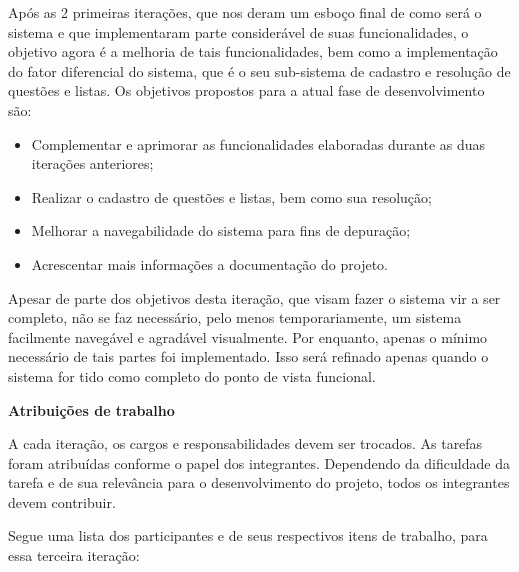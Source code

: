 \documentclass[12pt,letterpaper]{article}
\begin{document}
Após as 2 primeiras iterações, que nos deram um esboço final de como será o sistema 
e que implementaram parte considerável de suas funcionalidades, o objetivo agora é a 
melhoria de tais funcionalidades, bem como a implementação do fator diferencial do 
sistema, que é o seu sub-sistema de cadastro e resolução de questões e listas.
Os objetivos propostos para a atual fase de desenvolvimento são:

\begin{itemize}
\item{} Complementar e aprimorar as funcionalidades elaboradas durante as duas iterações anteriores;
\item{} Realizar o cadastro de questões e listas, bem como sua resolução;
\item{} Melhorar a navegabilidade do sistema para fins de depuração;
\item{} Acrescentar mais informações a documentação do projeto.
\end{itemize}

Apesar de parte dos objetivos desta iteração, que visam fazer o sistema vir a ser 
completo, não se faz necessário, pelo menos temporariamente, um sistema facilmente 
navegável e agradável visualmente. Por enquanto, apenas o mínimo necessário de tais 
partes foi implementado. Isso será refinado apenas quando o sistema for tido como completo 
do ponto de vista funcional.

\vspace{1cm}
{\large {\bf Atribuições de trabalho}}
\vspace{0.5cm}

A cada iteração, os cargos e responsabilidades devem ser trocados. As tarefas foram atribuídas conforme o papel dos integrantes. Dependendo da dificuldade da tarefa e de sua relevância para o desenvolvimento do projeto, todos os integrantes devem contribuir.

Segue uma lista dos participantes e de seus respectivos itens de trabalho, para essa terceira iteração: 
\end{document}
